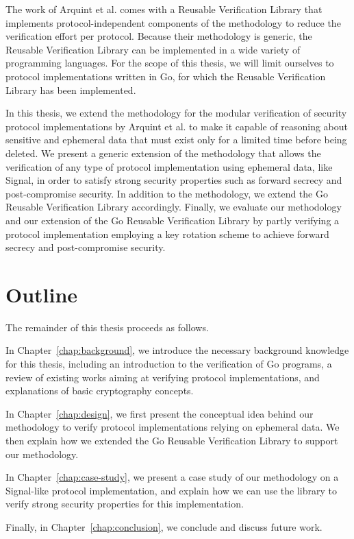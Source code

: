 The work of Arquint et al. comes with a Reusable Verification Library that implements protocol-independent components of the methodology to reduce the verification effort per protocol.
Because their methodology is generic, the Reusable Verification Library can be implemented in a wide variety of programming languages.
For the scope of this thesis, we will limit ourselves to protocol implementations written in Go, for which the Reusable Verification Library has been implemented.

In this thesis, we extend the methodology for the modular verification of security protocol implementations by Arquint et al. to make it capable of reasoning about sensitive and ephemeral data that must exist only for a limited time before being deleted.
We present a generic extension of the methodology that allows the verification of any type of protocol implementation using ephemeral data, like Signal, in order to satisfy strong security properties such as forward secrecy and post-compromise security.
In addition to the methodology, we extend the Go Reusable Verification Library accordingly.
Finally, we evaluate our methodology and our extension of the Go Reusable Verification Library by partly verifying a protocol implementation employing a key rotation scheme to achieve forward secrecy and post-compromise security.


\section{Outline}
\label{sec:outline}

The remainder of this thesis proceeds as follows.

In Chapter~\ref{chap:background}, we introduce the necessary background knowledge for this thesis, including an introduction to the verification of Go programs, a review of existing works aiming at verifying protocol implementations, and explanations of basic cryptography concepts.

In Chapter~\ref{chap:design}, we first present the conceptual idea behind our methodology to verify protocol implementations relying on ephemeral data. We then explain how we extended the Go Reusable Verification Library to support our methodology.

In Chapter~\ref{chap:case-study}, we present a case study of our methodology on a Signal-like protocol implementation, and explain how we can use the library to verify strong security properties for this implementation.

Finally, in Chapter~\ref{chap:conclusion}, we conclude and discuss future work.
